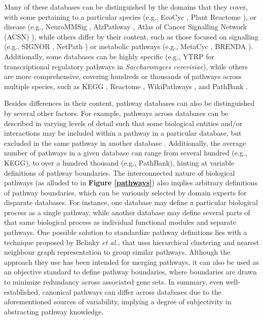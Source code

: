 Many of these databases can be distinguished by the domains that they cover,  with some pertaining to a particular species (e.g., EcoCyc \parencite{keseler2017}, Plant Reactome \parencite{naithani2020}), or disease (e.g., NeuroMMSig \parencite{domingo2017}, AlzPathway \parencite{mizuno2012}, Atlas of Cancer Signalling Network (ACSN) \parencite{kuperstein2015}), while others differ by their content, such as those focused on signalling (e.g., SIGNOR \parencite{perfetto2016}, NetPath \parencite{kandasamy2010}) or metabolic pathways (e.g., MetaCyc \parencite{caspi2014}, BRENDA \parencite{chang2021}). Additionally, some databases can be highly specific (e.g., YTRP \parencite{yang2014} for transcriptional regulatory pathways in \textit{Saccharomyces cerevisiae}), while others are more comprehensive, covering hundreds or thousands of pathways across multiple species, such as KEGG \parencite{kanehisa2000}, Reactome \parencite{jassal2020}, WikiPathways \parencite{martens2021}, and PathBank \parencite{wishart2020}.

Besides differences in their content, pathway databases can also be distinguished by several other factors. For example, pathways across databases can be described in varying levels of detail such that some biological entities and/or interactions may be included within a pathway in a particular database, but excluded in the same pathway in another database \parencite{domingo2018, domingo2019}. Additionally, the average number of pathways in a given database can range from several hundred (e.g., KEGG), to over a hundred thousand (e.g., PathBank), hinting at variable definitions of pathway boundaries. The interconnected nature of biological pathways (as alluded to in \textbf{Figure \ref{pathways}}) also implies arbitrary definitions of pathway boundaries, which can be variously selected by domain experts for disparate databases. For instance, one database may define a particular biological process as a single pathway, while another database may define several parts of that same biological process as individual functional modules and separate pathways. One possible solution to standardize pathway definitions lies with a technique proposed by Belinky \textit{et al.,} \parencite{belinky2015} that uses hierarchical clustering and nearest neighbour graph representation to group similar pathways. Although the approach they use has been intended for merging pathways, it can also be used as an objective standard to define pathway boundaries, where boundaries are drawn to minimize redundancy across associated gene sets. In summary, even well-established, canonical pathways can differ across databases due to the aforementioned sources of variability, implying a degree of subjectivity in abstracting pathway knowledge. 

